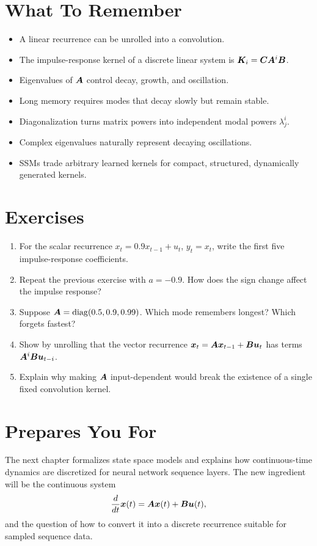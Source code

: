 \section{What To Remember}

\begin{itemize}
  \item A linear recurrence can be unrolled into a convolution.
  \item The impulse-response kernel of a discrete linear system is
  $\bm{K}_i = \bm{C}\bm{A}^i\bm{B}$.
  \item Eigenvalues of $\bm{A}$ control decay, growth, and oscillation.
  \item Long memory requires modes that decay slowly but remain stable.
  \item Diagonalization turns matrix powers into independent modal powers
  $\lambda_j^i$.
  \item Complex eigenvalues naturally represent decaying oscillations.
  \item SSMs trade arbitrary learned kernels for compact, structured, dynamically
  generated kernels.
\end{itemize}

\section{Exercises}

\begin{enumerate}
  \item For the scalar recurrence $x_t = 0.9x_{t-1}+u_t$, $y_t=x_t$, write the first
  five impulse-response coefficients.
  \item Repeat the previous exercise with $a=-0.9$. How does the sign change affect the
  impulse response?
  \item Suppose $\bm{A}=\operatorname{diag}(0.5,0.9,0.99)$. Which mode remembers longest? Which forgets
  fastest?
  \item Show by unrolling that the vector recurrence
  $\bm{x}_t=\bm{A}\bm{x}_{t-1}+\bm{B}\bm{u}_t$ has terms
  $\bm{A}^i\bm{B}\bm{u}_{t-i}$.
  \item Explain why making $\bm{A}$ input-dependent would break the existence of a single
  fixed convolution kernel.
\end{enumerate}

\section{Prepares You For}

The next chapter formalizes state space models and explains how continuous-time dynamics
are discretized for neural network sequence layers. The new ingredient will be the
continuous system
\[
  \frac{d}{dt}\bm{x}(t) = \bm{A}\bm{x}(t)+\bm{B}\bm{u}(t),
\]
and the question of how to convert it into a discrete recurrence suitable for sampled
sequence data.
